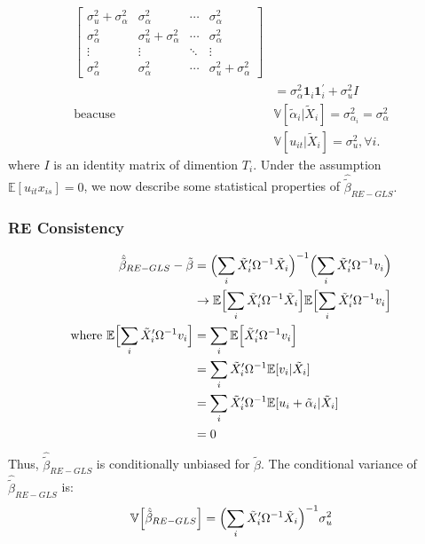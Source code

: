 \begin{align*}
\begin{bmatrix}
        \sigma_u^2 + \sigma_{\alpha}^2 & \sigma_{\alpha}^2 & \cdots & \sigma_{\alpha}^2 \\
        \sigma_{\alpha}^2 & \sigma_u^2 + \sigma_{\alpha}^2 & \cdots & \sigma_{\alpha}^2 \\
        \vdots & \vdots & \ddots & \vdots \\
        \sigma_{\alpha}^2 & \sigma_{\alpha}^2 & \cdots & \sigma_u^2 + \sigma_{\alpha}^2
    \end{bmatrix} \\
    &= \sigma_{\alpha}^2 \mathbf{1}_i \mathbf{1}_i^{\prime} + \sigma_u^2 I \\
    \text{beacuse } &\mathbb{V}[\tilde{\alpha}_i|\tilde{X}_i] = \sigma_{\alpha_i}^2 = \sigma_{\alpha}^2 \\
    &\mathbb{V}[u_{it} | \tilde{X}_i] = \sigma_u^2, \forall i.
\end{align*}
where $I$ is an identity matrix of dimention $T_i$.
Under the assumption $\mathbb{E}[u_{it} x_{is}] = 0$, we now describe some statistical properties of $\hat{\tilde{\beta}}_{RE-GLS}.$

\subsubsection{RE Consistency}
\begin{align*}
    \hat{\tilde{\beta}}_{RE-GLS} - \tilde{\beta} &= \Bigl( \sum_i \tilde{X}_i^{\prime} \Omega^{-1} \tilde{X}_i \Bigr)^{-1} \Bigl( \sum_i \tilde{X}_i^{\prime} \Omega^{-1} v_i \Bigr) \\
    & \rightarrow \mathbb{E}\Bigl[ \sum_i \tilde{X}_i^{\prime} \Omega^{-1} \tilde{X}_i \Bigr] \mathbb{E}\Bigl[ \sum_i \tilde{X}_i^{\prime} \Omega^{-1} v_i \Bigr] \\
    \text{where } \mathbb{E}\Bigl[ \sum_i \tilde{X}_i^{\prime} \Omega^{-1} v_i \Bigr] &= \sum_i \mathbb{E}\Bigl[ \tilde{X}_i^{\prime} \Omega^{-1} v_i \Bigr] \\
    &= \sum_i \tilde{X}_i^{\prime} \Omega^{-1} \mathbb{E}[v_i | \tilde{X}_i] \\
    &= \sum_i \tilde{X}_i^{\prime} \Omega^{-1} \mathbb{E}[u_i + \tilde{\alpha}_i | \tilde{X}_i] \\
    &=0
\end{align*}
Thus, $\hat{\tilde{\beta}}_{RE-GLS} $ is conditionally unbiased for $\tilde{\beta}$.
The conditional variance of $\hat{\tilde{\beta}}_{RE-GLS}$ is:
\begin{align*}
    \mathbb{V}\Bigl[\hat{\tilde{\beta}}_{RE-GLS}\Bigr] = \Bigl( \sum_i \tilde{X}_i^{\prime} \Omega^{-1} \tilde{X}_i \Bigr)^{-1} \sigma_{u}^2
\end{align*}


